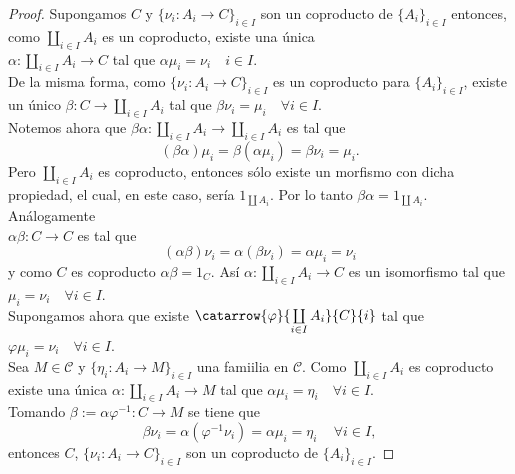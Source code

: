 \documentclass{article}
\begin{document}
\begin{proof}
Supongamos $C$ y $\{\nu_i:A_i\to C\}_{i\in I}$ son un coproducto de $\{A_i\}_{i\in I}$ entonces, como $\displaystyle\coprod_{i\in I}A_i$ es un
coproducto, existe una única \\$\alpha:\displaystyle\coprod_{i\in I}A_i\longrightarrow C$ tal que $\alpha\mu_i=\nu_i\quad i\in I$.\\
De la misma forma, como $\{\nu_i:A_i\to C\}_{i\in I}$ es un coproducto para $\{A_i\}_{i\in I}$, existe un único $\beta:C\to \displaystyle\coprod_{i\in I}A_i$
tal que $\beta\nu_i=\mu_i\quad \forall i\in I$.\\

Notemos ahora que $\beta\alpha:\displaystyle\coprod_{i\in I}A_i\longrightarrow \displaystyle\coprod_{i\in I}A_i$  es tal que 
\[(\beta\alpha)\mu_i=\beta(\alpha\mu_i)=\beta\nu_i=\mu_i.
\]
Pero $\displaystyle\coprod_{i\in I}A_i$ es coproducto, entonces sólo existe un morfismo con dicha propiedad, el cual, en este caso, sería 
$1_{\coprod A_i}$. Por lo tanto $\beta\alpha=1_{\coprod A_i}$. Análogamente \\$\alpha\beta:C\to C$ es tal que 
\[(\alpha\beta)\nu_i=\alpha(\beta\nu_i)=\alpha\mu_i=\nu_i\]
y como $C$ es coproducto $\alpha\beta=1_C.$ Así $\alpha:\displaystyle\coprod_{i\in I}A_i\to
C$ es un isomorfismo tal que $\mu_i=\nu_i\quad \forall i\in I$.\\

Supongamos ahora que existe $\catarrow{\varphi}{\coprod\limits_{i\in I}A_i}{C}{i}$ tal que $\varphi\mu_i=\nu_i\quad \forall i\in I$.\\

Sea $M\in \mathscr{C}$ y $\{\eta_i:A_i\to M\}_{i\in I}$ una famiilia en $\mathscr{C}$. Como $\displaystyle\coprod_{i\in I}A_i$ es coproducto
existe una única $\alpha:\displaystyle\coprod_{i\in I}A_i\longrightarrow M$ tal que $\alpha\mu_i=\eta_i\quad \forall i\in I$.\\
Tomando $\beta:=\alpha\varphi^{-1}:C\to M$ se tiene que \[\beta\nu_i=\alpha(\varphi^{-1}\nu_i)=\alpha\mu_i=\eta_i\,\quad \forall i\in I,\] entonces 
$C$, $\{\nu_i:A_i\to C\}_{i\in I}$ son un coproducto de $\{A_i\}_{i\in I}.$
\end{proof}
\end{document}
